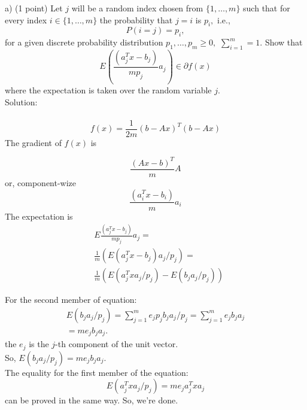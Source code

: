 \documentclass{article}
\begin{document}
a) (1 point) Let  $j$ will be a random index chosen from 
$\{1, \dots, m\}$ such that for every index 
$i \in \{1, \dots, m\}$ the probability that $j = i$
is $p_i,$ i.e., 
$$
P(i = j) = p_i,
$$
for a given discrete probability distribution
$p_1, \dots, p_m \geq 0, $
$\sum_{i=1}^{m} = 1.$ 
Show that 
$$
E(\frac{(a_j^T x - b_j)}{m p_j} a_j) \in \partial f(x)
$$
where the expectation is taken over the random variable $j.$ \\

Solution: \\ \\

$$
f(x) = \frac{1}{2 m} (b - Ax)^T (b - Ax)
$$
The gradient of $f(x)$ is

$$
\frac{(A x - b)^T}{m} A
$$
or, component-wize
$$
\frac{(a_i^T x - b_i)}{m} a_i
$$
The expectation is
\begin{align*}
&E\frac{(a_j^T x - b_j)}{m p_j} a_j = \\
&\frac{1}{m} (E(a_j^T x - b_j) a_j / p_j)  = \\
&\frac{1}{m} (E(a_j^T x a_j / p_j) - E(b_ja_j / p_j))
\end{align*}

For the second member of equation:
\begin{align*}
E(b_j a_j / p_j)  = 
\sum_{j=1}^m e_j p_j b_j a_j / p_j = 
\sum_{j=1}^m e_j b_j a_j \\=  m  e_j b_j a_j.
\end{align*}	
the $e_j $  is the $j$-th component of the unit vector. \\
So, $ E(b_j a_j/p_j) = m  e_j b_j a_j.$ \\
The equality for the first member of the equation:
$$
E(a_j^T x a_j/p_j) = m e_j a_j^T x a_j
$$
can be proved in the same way.
So, we're done.
\end{document}
